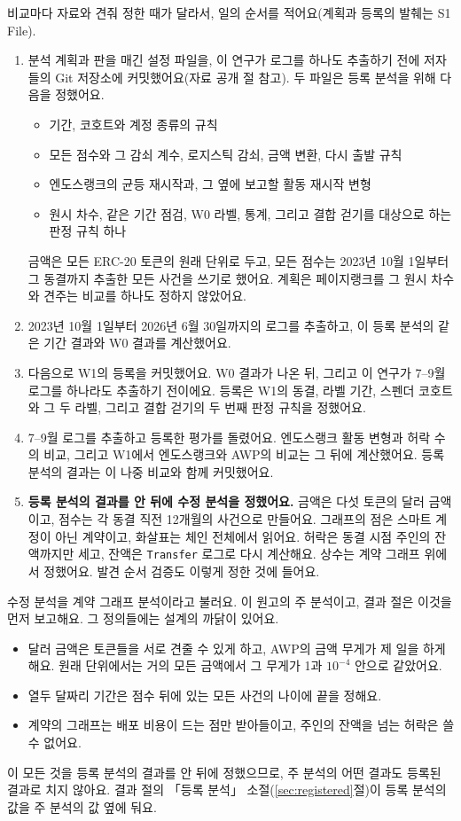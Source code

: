 비교마다 자료와 견줘 정한 때가 달라서, 일의 순서를 적어요(계획과 등록의 발췌는 S1 File).
\begin{enumerate}
\item 분석 계획과 판을 매긴 설정 파일을, 이 연구가 로그를 하나도 추출하기 전에 저자들의 Git 저장소에 커밋했어요(자료 공개 절 참고). 두 파일은 등록 분석을 위해 다음을 정했어요.
\begin{itemize}
\item 기간, 코호트와 계정 종류의 규칙
\item 모든 점수와 그 감쇠 계수, 로지스틱 감쇠, 금액 변환, 다시 출발 규칙
\item 엔도스랭크의 균등 재시작과, 그 옆에 보고할 활동 재시작 변형
\item 원시 차수, 같은 기간 점검, W0 라벨, 통계, 그리고 결합 걷기를 대상으로 하는 판정 규칙 하나
\end{itemize}
금액은 모든 ERC-20 토큰의 원래 단위로 두고, 모든 점수는 2023년 10월 1일부터 그 동결까지 추출한 모든 사건을 쓰기로 했어요. 계획은 페이지랭크를 그 원시 차수와 견주는 비교를 하나도 정하지 않았어요.
\item 2023년 10월 1일부터 2026년 6월 30일까지의 로그를 추출하고, 이 등록 분석의 같은 기간 결과와 W0 결과를 계산했어요.
\item 다음으로 W1의 등록을 커밋했어요. W0 결과가 나온 뒤, 그리고 이 연구가 7–9월 로그를 하나라도 추출하기 전이에요. 등록은 W1의 동결, 라벨 기간, 스펜더 코호트와 그 두 라벨, 그리고 결합 걷기의 두 번째 판정 규칙을 정했어요.
\item 7–9월 로그를 추출하고 등록한 평가를 돌렸어요. 엔도스랭크 활동 변형과 허락 수의 비교, 그리고 W1에서 엔도스랭크와 AWP의 비교는 그 뒤에 계산했어요. 등록 분석의 결과는 이 나중 비교와 함께 커밋했어요.
\item \textbf{등록 분석의 결과를 안 뒤에 수정 분석을 정했어요.} 금액은 다섯 토큰의 달러 금액이고, 점수는 각 동결 직전 12개월의 사건으로 만들어요. 그래프의 점은 스마트 계정이 아닌 계약이고, 화살표는 체인 전체에서 읽어요. 허락은 동결 시점 주인의 잔액까지만 세고, 잔액은 \texttt{Transfer} 로그로 다시 계산해요. 상수는 계약 그래프 위에서 정했어요. 발견 순서 검증도 이렇게 정한 것에 들어요.
\end{enumerate}

수정 분석을 계약 그래프 분석이라고 불러요. 이 원고의 주 분석이고, 결과 절은 이것을 먼저 보고해요. 그 정의들에는 설계의 까닭이 있어요.
\begin{itemize}
\item 달러 금액은 토큰들을 서로 견줄 수 있게 하고, AWP의 금액 무게가 제 일을 하게 해요. 원래 단위에서는 거의 모든 금액에서 그 무게가 1과 $10^{-4}$ 안으로 같았어요.
\item 열두 달짜리 기간은 점수 뒤에 있는 모든 사건의 나이에 끝을 정해요.
\item 계약의 그래프는 배포 비용이 드는 점만 받아들이고, 주인의 잔액을 넘는 허락은 쓸 수 없어요.
\end{itemize}
이 모든 것을 등록 분석의 결과를 안 뒤에 정했으므로, 주 분석의 어떤 결과도 등록된 결과로 치지 않아요. 결과 절의 「등록 분석」 소절(\ref{sec:registered}절)이 등록 분석의 값을 주 분석의 값 옆에 둬요.

